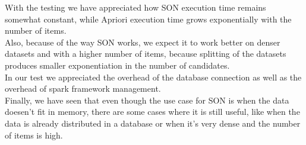 \documentclass[a4paper]{article}
\begin{document}
	With the testing we have appreciated how SON execution time remains somewhat constant, while Apriori execution time grows exponentially with the number of items.\\
	Also, because of the way SON works, we expect it to work better on denser datasets and with a higher number of items, because splitting of the datasets produces
	smaller exponentiation in the number of candidates.\\	
	In our test we appreciated the overhead of the database connection as well as the overhead of spark framework management.\\

	Finally, we have seen that even though the use case for SON is when the data doesen't fit in memory, there are some cases where it is still useful, like when the data is
	already distributed in a database or when it's very dense and the number of items is high.\\
	
\end{document}
